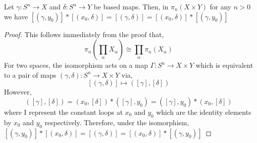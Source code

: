 \documentclass[12pt]{extarticle}
\begin{document}
\begin{lemma} \label{product_decomp}
Let $\gamma : S^n \to X$ and $\delta : S^n \to Y$ be based maps. Then, in $\pi_n(X \times Y)$ for any $n > 0$ we have $[(\gamma, y_0)] * [(x_0, \delta)] = [(\gamma, \delta)] = [(x_0, \delta)] * [(\gamma, y_0)]$
\end{lemma}

\begin{proof}
This follows immediately from the proof that,
\[\pi_n \left( \prod_\alpha X_\alpha \right) \cong \prod_{\alpha} \pi_n(X_\alpha)\]
For two spaces, the isomorphism acts on a map $\Gamma : S^n \to X \times Y$ which is equivalent to a pair of maps $(\gamma, \delta) : S^n \to X \times Y$ via,
\[ [(\gamma, \delta)] \mapsto ([\gamma], [\delta]) \]
However,
\[ ([\gamma], [\delta]) = (x_0, [\delta]) * ([\gamma], y_0) = ([\gamma], y_0) * (x_0, [\delta]) \]
where I represent the constant loops at $x_0$ and $y_0$ which are the identity elements by $x_0$ and $y_0$ respectively. Therefore, under the isomorphism,
$[(\gamma, y_0)] * [(x_0, \delta)] = [(\gamma, \delta)] = [(x_0, \delta)] * [(\gamma, y_0)]$
\end{proof}
\end{document}
